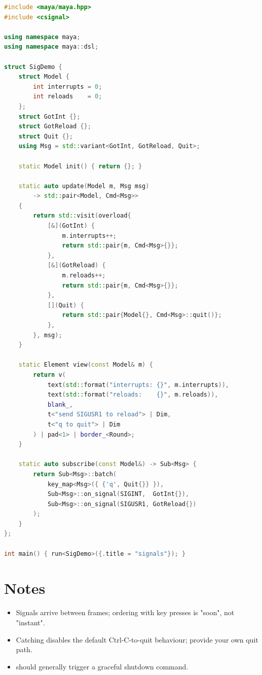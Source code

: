 \begin{lstlisting}[language=C++]
#include <maya/maya.hpp>
#include <csignal>

using namespace maya;
using namespace maya::dsl;

struct SigDemo {
    struct Model {
        int interrupts = 0;
        int reloads    = 0;
    };
    struct GotInt {};
    struct GotReload {};
    struct Quit {};
    using Msg = std::variant<GotInt, GotReload, Quit>;

    static Model init() { return {}; }

    static auto update(Model m, Msg msg)
        -> std::pair<Model, Cmd<Msg>>
    {
        return std::visit(overload{
            [&](GotInt) {
                m.interrupts++;
                return std::pair{m, Cmd<Msg>{}};
            },
            [&](GotReload) {
                m.reloads++;
                return std::pair{m, Cmd<Msg>{}};
            },
            [](Quit) {
                return std::pair{Model{}, Cmd<Msg>::quit()};
            },
        }, msg);
    }

    static Element view(const Model& m) {
        return v(
            text(std::format("interrupts: {}", m.interrupts)),
            text(std::format("reloads:    {}", m.reloads)),
            blank_,
            t<"send SIGUSR1 to reload"> | Dim,
            t<"q to quit"> | Dim
        ) | pad<1> | border_<Round>;
    }

    static auto subscribe(const Model&) -> Sub<Msg> {
        return Sub<Msg>::batch(
            key_map<Msg>({ {'q', Quit{}} }),
            Sub<Msg>::on_signal(SIGINT,  GotInt{}),
            Sub<Msg>::on_signal(SIGUSR1, GotReload{})
        );
    }
};

int main() { run<SigDemo>({.title = "signals"}); }
\end{lstlisting}

\section{Notes}

\begin{itemize}[leftmargin=*]
  \item Signals arrive between frames; ordering with key
    presses is "soon", not "instant".
  \item Catching  disables the default
    Ctrl-C-to-quit behaviour; provide your own quit path.
  \item {} should generally trigger a graceful
    shutdown command.
\end{itemize}

